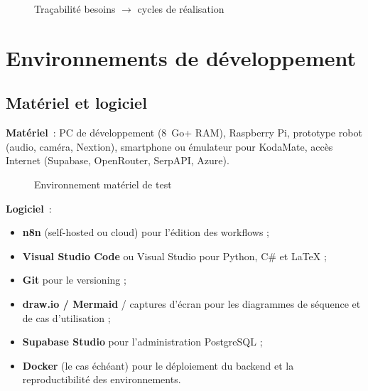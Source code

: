 \documentclass[a4paper,12pt]{report}
\begin{document}
	\begin{figure}[htbp]
		\centering
		\caption{Traçabilité besoins $\rightarrow$ cycles de réalisation}
		\label{fig:ch2-tracabilite}
	\end{figure}
	
	
	\section{Environnements de développement}
	
	\subsection{Matériel et logiciel}
	
	\textbf{Matériel}~: PC de développement (8~Go+ RAM), Raspberry Pi, prototype robot
	(audio, caméra, Nextion), smartphone ou émulateur pour KodaMate, accès Internet
	(Supabase, OpenRouter, SerpAPI, Azure).
	
	\begin{figure}[htbp]
		\centering
		\caption{Environnement matériel de test}
		\label{fig:ch2-env-materiel}
	\end{figure}
	
	\textbf{Logiciel}~:
	
	\begin{itemize}
		\item \textbf{n8n} (self-hosted ou cloud) pour l'édition des workflows ;
		\item \textbf{Visual Studio Code} ou Visual Studio pour Python, C\# et LaTeX ;
		\item \textbf{Git} pour le versioning ;
		\item \textbf{draw.io / Mermaid} / captures d'écran pour les diagrammes de séquence et de
		cas d'utilisation ;
		\item \textbf{Supabase Studio} pour l'administration PostgreSQL ;
		\item \textbf{Docker} (le cas échéant) pour le déploiement du backend et la
		reproductibilité des environnements.
	\end{itemize}
	
\end{document}
